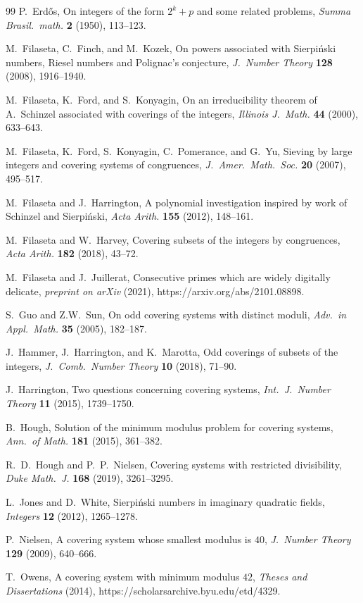 \documentclass[12pt]{article}
\theoremstyle{definition}
\begin{document}
\begin{thebibliography}{99}
 P.~Erd\H{o}s, On integers of the form $2^k+p$ and some related problems, \textit{Summa Brasil.\ math.\/} \textbf{2} (1950), 113--123.

M.~Filaseta, C.~Finch, and M.~Kozek, On powers associated with Sierpi\'{n}ski numbers, Riesel numbers and Polignac's conjecture, \textit{J.\ Number Theory} \textbf{128} (2008), 1916--1940. 

M.~Filaseta, K.~Ford, and S.~Konyagin, On an irreducibility theorem of A.\ Schinzel associated with coverings of the integers, \textit{Illinois J.\ Math.\/} \textbf{44} (2000), 633--643.

M.~Filaseta, K.~Ford, S.~Konyagin, C.~Pomerance, and G.~Yu, Sieving by large integers and covering systems of congruences, \textit{J.\ Amer.\ Math.\ Soc.\/} \textbf{20} (2007), 495--517.

M.~Filaseta and J.~Harrington, A polynomial investigation inspired by work of Schinzel and Sierpi\'{n}ski, \textit{Acta Arith.\/} \textbf{155} (2012), 148--161.

M.~Filaseta and W.~Harvey, Covering subsets of the integers by congruences, \textit{Acta Arith.\/} \textbf{182} (2018), 43--72.

M.~Filaseta and J.~Juillerat, Consecutive primes which are widely digitally delicate, \textit{preprint on arXiv} (2021), https://arxiv.org/abs/2101.08898.

  S.~Guo and Z.W.~Sun, On odd covering systems with distinct moduli, \textit{Adv.\ in Appl.\ Math.\/} \textbf{35} (2005), 182--187.

J.~Hammer, J.~Harrington, and K.~Marotta, Odd coverings of subsets of the integers, \textit{J.\ Comb.\ Number Theory} \textbf{10} (2018), 71--90.

J.~Harrington, Two questions concerning covering systems, \textit{Int.\ J.\ Number Theory} \textbf{11} (2015), 1739--1750.

B.~Hough, Solution of the minimum modulus problem for covering systems, \textit{Ann.\ of Math.\/} \textbf{181} (2015), 361--382.

 R.~D.~Hough and P.~P.~Nielsen, Covering systems with restricted divisibility, \textit{Duke Math.\ J.\/} \textbf{168} (2019), 3261--3295.

L.~Jones and D.~White, Sierpi\'{n}ski numbers in imaginary quadratic fields, \textit{Integers} \textbf{12} (2012), 1265--1278. 

P.~Nielsen, A covering system whose smallest modulus is $40$, \textit{J.\ Number Theory} \textbf{129} (2009), 640--666.

T.~Owens, A covering system with minimum modulus $42$, \textit{Theses and Dissertations} (2014), https://scholarsarchive.byu.edu/etd/4329.
\end{thebibliography}
\end{document}
